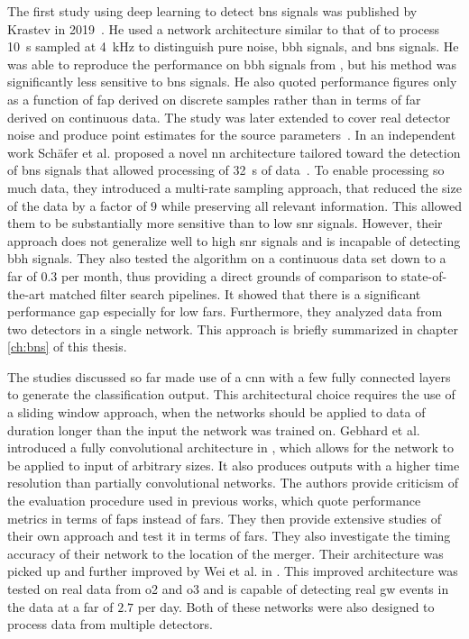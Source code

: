 The first study using deep learning to detect \acrshort{bns} signals was published by Krastev in 2019~\cite{Krastev:2019koe}. He used a network architecture similar to that of \cite{George:2016hay} to process \SI{10}{\second} sampled at \SI{4}{\kilo\hertz} to distinguish pure noise, \acrshort{bbh} signals, and \acrshort{bns} signals. He was able to reproduce the performance on \acrshort{bbh} signals from \cite{George:2016hay, Gabbard:2017lja}, but his method was significantly less sensitive to \acrshort{bns} signals. He also quoted performance figures only as a function of \acrshort{fap} derived on discrete samples rather than in terms of \acrshort{far} derived on continuous data. The study was later extended to cover real detector noise and produce point estimates for the source parameters~\cite{Krastev:2020skk}. In an independent work Schäfer et al. proposed a novel \acrshort{nn} architecture tailored toward the detection of \acrshort{bns} signals that allowed processing of \SI{32}{\second} of data~\cite{Schafer:2020kor}. To enable processing so much data, they introduced a multi-rate sampling approach, that reduced the size of the data by a factor of $9$ while preserving all relevant information. This allowed them to be substantially more sensitive than \cite{Krastev:2019koe} to low \acrshort{snr} signals. However, their approach does not generalize well to high \acrshort{snr} signals and is incapable of detecting \acrshort{bbh} signals. They also tested the algorithm on a continuous data set down to a \acrshort{far} of $0.3$ per month, thus providing a direct grounds of comparison to state-of-the-art matched filter search pipelines. It showed that there is a significant performance gap especially for low \acrshort{far}s. Furthermore, they analyzed data from two detectors in a single network. This approach is briefly summarized in chapter \ref{ch:bns} of this thesis. 

The studies discussed so far made use of a \acrshort{cnn} with a few fully connected layers to generate the classification output. This architectural choice requires the use of a sliding window approach, when the networks should be applied to data of duration longer than the input the network was trained on. Gebhard et al. introduced a fully convolutional architecture in \cite{Gebhard:2019ldz}, which allows for the network to be applied to input of arbitrary sizes. It also produces outputs with a higher time resolution than partially convolutional networks. The authors provide criticism of the evaluation procedure used in previous works, which quote performance metrics in terms of \acrshort{fap}s instead of \acrshort{far}s. They then provide extensive studies of their own  approach and test it in terms of \acrshort{far}s. They also investigate the timing accuracy of their network to the location of the merger. Their architecture was picked up and further improved by Wei et al. in \cite{Wei:2020ztw}. This improved architecture was tested on real data from \acrshort{o2} and \acrshort{o3} and is capable of detecting real \acrshort{gw} events in the data at a \acrshort{far} of $2.7$ per day. Both of these networks were also designed to process data from multiple detectors.


